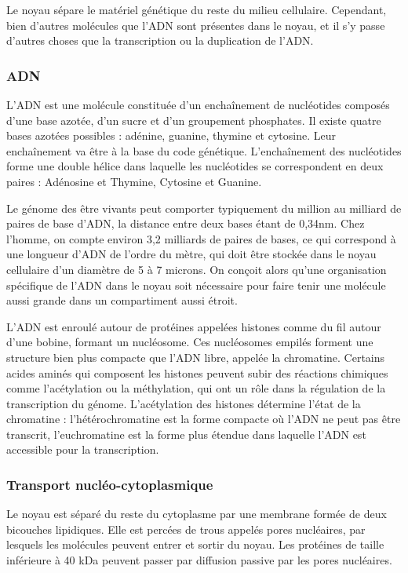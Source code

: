 \documentclass{report}
\begin{document}
Le noyau sépare le matériel génétique du reste du milieu cellulaire. Cependant, bien d'autres molécules que l'ADN sont présentes dans le noyau, et il s'y passe d'autres choses que la transcription ou la duplication de l'ADN. 

\subsubsection{ADN}

L'ADN est une molécule constituée d'un enchaînement de nucléotides composés d'une base azotée, d'un sucre et d'un groupement phosphates. Il existe quatre bases azotées possibles : adénine, guanine, thymine et cytosine. Leur enchaînement va être à la base du code génétique.
L'enchaînement des nucléotides forme une double hélice dans laquelle les nucléotides se correspondent en deux paires : Adénosine et Thymine, Cytosine et Guanine. 

Le génome des être vivants peut comporter typiquement du million au milliard de paires de base d'ADN, la distance entre deux bases étant de 0,34nm. Chez l'homme, on compte environ 3,2 milliards de paires de bases, ce qui correspond à une longueur d'ADN de l'ordre du mètre, qui doit être stockée dans le noyau cellulaire d'un diamètre de 5 à 7 microns. 
On conçoit alors qu'une organisation spécifique de l'ADN dans le noyau soit nécessaire pour faire tenir une molécule aussi grande dans un compartiment aussi étroit. 

L'ADN est enroulé autour de protéines appelées histones comme du fil autour d'une bobine, formant un nucléosome. Ces nucléosomes empilés forment une structure bien plus compacte que l'ADN libre, appelée la chromatine. Certains acides aminés qui composent les histones peuvent subir des réactions chimiques comme l'acétylation ou la méthylation, qui ont un rôle dans la régulation de la transcription du génome. L'acétylation des histones détermine l'état de la chromatine : l'hétérochromatine est la forme compacte où l'ADN ne peut pas être transcrit, l'euchromatine est la forme plus étendue dans laquelle l'ADN est accessible pour la transcription. 

\subsubsection{Transport nucléo-cytoplasmique}
Le noyau est séparé du reste du cytoplasme par une membrane formée de deux bicouches lipidiques. Elle est percées de trous appelés pores nucléaires, par lesquels les molécules peuvent entrer et sortir du noyau. Les protéines de taille inférieure à 40 kDa peuvent passer par diffusion passive par les pores nucléaires. 
\end{document}
